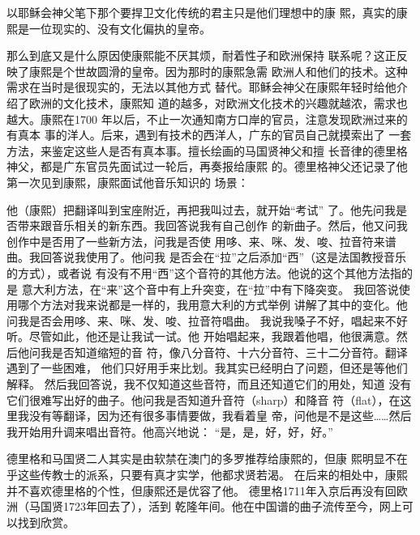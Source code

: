 以耶稣会神父笔下那个要捍卫文化传统的君主只是他们理想中的康%
熙，真实的康熙是一位现实的、没有文化偏执的皇帝。%
\par
那么到底又是什么原因使康熙能不厌其烦，耐着性子和欧洲保持%
联系呢？这正反映了康熙是个世故圆滑的皇帝。因为那时的康熙急需%
欧洲人和他们的技术。这种需求在当时是很现实的，无法以其他方式%
替代。耶稣会神父在康熙年轻时给他介绍了欧洲的文化技术，康熙知%
道的越多，对欧洲文化技术的兴趣就越浓，需求也越大。康熙在1700%
年以后，不止一次通知南方口岸的官员，注意发现欧洲过来的有真本%
事的洋人。后来，遇到有技术的西洋人，广东的官员自己就摸索出了%
一套方法，来鉴定这些人是否有真本事。擅长绘画的马国贤神父和擅%
长音律的德里格神父，都是广东官员先面试过一轮后，再奏报给康熙%
的。德里格神父还记录了他第一次见到康熙，康熙面试他音乐知识的%
场景：%
\par
{\bookkai 他（康熙）把翻译叫到宝座附近，再把我叫过去，就开始“考试”}%
{\bookkai 了。他先问我是否带来跟音乐相关的新东西。我回答说我有自己创作}%
{\bookkai 的新曲子。然后，他又问我创作中是否用了一些新方法，问我是否使}%
{\bookkai 用哆、来、咪、发、唆、拉音符来谱曲。我回答说我使用了。他问我}%
{\bookkai 是否会在“拉”之后添加“西”（这是法国教授音乐的方式），或者说}%
{\bookkai 有没有不用“西”这个音符的其他方法。他说的这个其他方法指的是}%
{\bookkai 意大利方法，在“来”这个音中有上升突变，在“拉”中有下降突变。}%
{\bookkai 我回答说使用哪个方法对我来说都是一样的，我用意大利的方式举例}%
{\bookkai 讲解了其中的变化。他问我是否会用哆、来、咪、发、唆、拉音符唱曲。}%
{\bookkai 我说我嗓子不好，唱起来不好听。尽管如此，他还是让我试一试。他}%
{\bookkai 开始唱起来，我跟着他唱，他很满意。然后他问我是否知道缩短的音}%
{\bookkai 符，像八分音符、十六分音符、三十二分音符。翻译遇到了一些困难，}%
{\bookkai 他们只好用手来比划。我其实已经明白了问题，但还是等他们解释。}%
{\bookkai 然后我回答说，我不仅知道这些音符，而且还知道它们的用处，知道}%
{\bookkai 没有它们很难写出好的曲子。他问我是否知道升音符（sharp）和降音}%
{\bookkai 符（flat），在这里我没有等翻译，因为还有很多事情要做，我看着皇}%
{\bookkai 帝，问他是不是这些……然后我开始用升调来唱出音符。他高兴地说：}%
{\bookkai “是，是，好，好，好。”}%
\par
德里格和马国贤二人其实是由软禁在澳门的多罗推荐给康熙的，但康%
熙明显不在乎这些传教士的派系，只要有真才实学，他都求贤若渴。%
在后来的相处中，康熙并不喜欢德里格的个性，但康熙还是优容了他。%
德里格1711年入京后再没有回欧洲（马国贤1723年回去了），活到%
乾隆年间。他在中国谱的曲子流传至今，网上可以找到欣赏。%
\par
